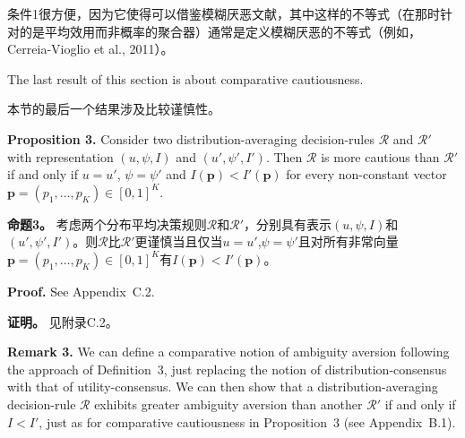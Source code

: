 \documentclass[12pt,a4paper]{article}
\newenvironment{original}
  {\par\noindent\ignorespaces}
  {\par}
\newenvironment{translation}
  {\par\noindent{\color{transblue}\ignorespaces}}
  {\par\medskip}
\begin{document}
\begin{translation}
条件1很方便，因为它使得可以借鉴模糊厌恶文献，其中这样的不等式（在那时针对的是平均效用而非概率的聚合器）通常是定义模糊厌恶的不等式（例如，Cerreia-Vioglio et al., 2011）。
\end{translation}

\begin{original}
The last result of this section is about comparative cautiousness.
\end{original}

\begin{translation}
本节的最后一个结果涉及比较谨慎性。
\end{translation}

\begin{original}
\textbf{Proposition 3.} Consider two distribution-averaging decision-rules $\mathcal{R}$ and $\mathcal{R}'$ with representation $(u, \psi, I)$ and $(u', \psi', I')$. Then $\mathcal{R}$ is more cautious than $\mathcal{R}'$ if and only if $u = u'$, $\psi = \psi'$ and $I(\mathbf{p}) < I'(\mathbf{p})$ for every non-constant vector $\mathbf{p} = (p_{1}, \dots, p_{K}) \in [0,1]^{K}$.
\end{original}

\begin{translation}
\textbf{命题3。} 考虑两个分布平均决策规则$\mathcal{R}$和$\mathcal{R}'$，分别具有表示$(u, \psi, I)$和$(u', \psi', I')$。则$\mathcal{R}$比$\mathcal{R}'$更谨慎当且仅当$u = u'$,$\psi = \psi'$且对所有非常向量$\mathbf{p} = (p_{1}, \dots, p_{K}) \in [0,1]^{K}$有$I(\mathbf{p}) < I'(\mathbf{p})$。
\end{translation}

\begin{original}
\textbf{Proof.} See Appendix~C.2.
\end{original}

\begin{translation}
\textbf{证明。} 见附录C.2。
\end{translation}

\begin{original}
\textbf{Remark 3.} We can define a comparative notion of ambiguity aversion following the approach of Definition~3, just replacing the notion of distribution-consensus with that of utility-consensus. We can then show that a distribution-averaging decision-rule $\mathcal{R}$ exhibits greater ambiguity aversion than another $\mathcal{R}'$ if and only if $I < I'$, just as for comparative cautiousness in Proposition~3 (see Appendix~B.1).
\end{original}
\end{document}
